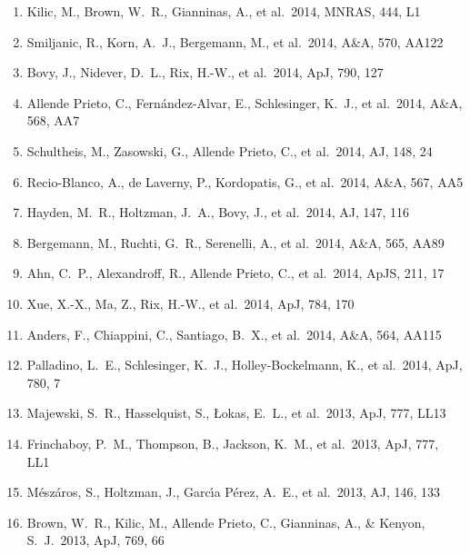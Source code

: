 \documentclass[12pt]{article}
\begin{document}
\begin{enumerate}
\item Kilic, M., Brown, W.~R., 
Gianninas, A., et al.\ 2014, MNRAS, 444, L1 


\item Smiljanic, R., Korn, A.~J., Bergemann, M., et al.\ 2014, A\&A, 570, AA122 


\item Bovy, J., Nidever, D.~L., 
Rix, H.-W., et al.\ 2014, ApJ, 790, 127 


\item Allende Prieto, C., Fern{\'a}ndez-Alvar, E., Schlesinger, K.~J., et al.\ 2014, A\&A, 568, AA7 


\item Schultheis, M., 
Zasowski, G., Allende Prieto, C., et al.\ 2014, AJ, 148, 24 


\item Recio-Blanco, A., de Laverny, P., Kordopatis, G., et al.\ 2014, A\&A, 567, AA5 


\item Hayden, M.~R., Holtzman, 
J.~A., Bovy, J., et al.\ 2014, AJ, 147, 116 


\item Bergemann, M., Ruchti, G.~R., Serenelli, A., et al.\ 2014, A\&A, 565, AA89 


\item Ahn, C.~P., Alexandroff, 
R., Allende Prieto, C., et al.\ 2014, ApJS, 211, 17 


\item Xue, X.-X., Ma, Z., Rix, 
H.-W., et al.\ 2014, ApJ, 784, 170 


\item Anders, F., Chiappini, C., Santiago, B.~X., et al.\ 2014, A\&A, 564, AA115 


\item Palladino, L.~E., 
Schlesinger, K.~J., Holley-Bockelmann, K., et al.\ 2014, ApJ, 780, 7 


\item Majewski, S.~R., 
Hasselquist, S., {\L}okas, E.~L., et al.\ 2013, ApJ, 777, LL13 


\item Frinchaboy, P.~M., 
Thompson, B., Jackson, K.~M., et al.\ 2013, ApJ, 777, LL1 


\item 
M{\'e}sz{\'a}ros, S., Holtzman, J., Garc{\'{\i}}a P{\'e}rez, A.~E., et al.\ 
2013, AJ, 146, 133 


\item Brown, W.~R., Kilic, M., 
Allende Prieto, C., Gianninas, A., \& Kenyon, S.~J.\ 2013, ApJ, 769, 66 



\end{enumerate}
\end{document}
